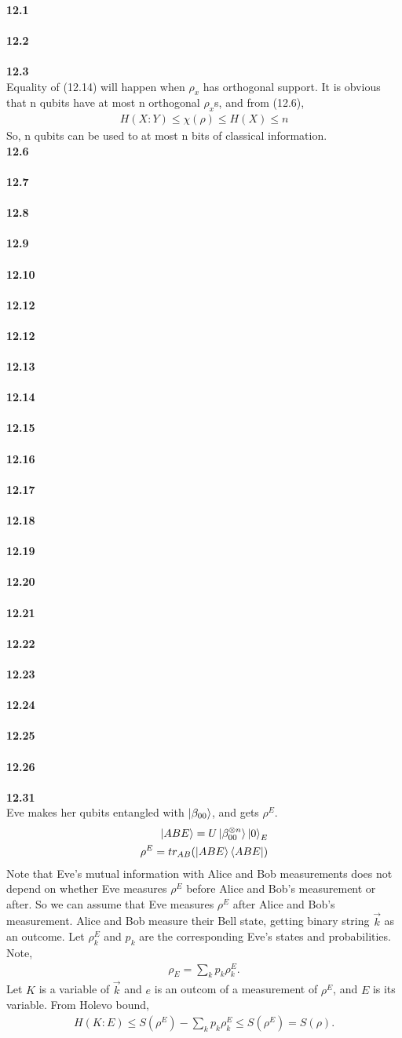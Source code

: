 \documentclass[12pt]{book}
\newcommand{\Textbf}[1]{\hspace{3mm}\\ \textbf{#1}\\}
\begin{document}
\Textbf{12.1}
\Textbf{12.2}
\Textbf{12.3}
Equality of (12.14) will happen when $\rho_x$ has orthogonal support. It is obvious that n qubits have at most n orthogonal $\rho_x$s, and from (12.6), 
\begin{align}
H(X:Y) \le \chi(\rho) \le H(X) \le n
\end{align}
So, n qubits can be used to at most n bits of classical information.
\Textbf{12.6}
\Textbf{12.7}

\Textbf{12.8}
\Textbf{12.9}
\Textbf{12.10}
\Textbf{12.12}
\Textbf{12.12}
\Textbf{12.13}
\Textbf{12.14}
\Textbf{12.15}
\Textbf{12.16}
\Textbf{12.17}
\Textbf{12.18}
\Textbf{12.19}
\Textbf{12.20}
\Textbf{12.21}
\Textbf{12.22}
\Textbf{12.23}
\Textbf{12.24}
\Textbf{12.25}
\Textbf{12.26}
\Textbf{12.31}
Eve makes her qubits entangled with $\ket{\beta_{00}}$, and gets $\rho^E$.
\begin{align}
\ket{ABE} = U\ket{\beta_{00}^{\otimes n}}\ket{0}_E\\
\rho^E = tr_{AB} (\ket{ABE} \bra{ABE})
\end{align}
Note that Eve's mutual information with Alice and Bob measurements does not depend on whether Eve measures $\rho^E$ before Alice and Bob's measurement or after.
So we can assume that Eve measures $\rho^E$ after Alice and Bob's measurement.
Alice and Bob measure their Bell state, getting binary string $\vec{k}$ as an outcome.
Let $\rho^E_k$ and $p_k$ are the corresponding Eve's states and probabilities.
Note,
\begin{align}
\rho_E = \sum_k p_k \rho^E_k.
\end{align}
Let $K$ is a variable of $\vec{k}$ and $e$ is an outcom of a measurement of $\rho^E$, and $E$ is its variable.  From Holevo bound, 
\begin{align}
H(K:E) \le S(\rho^E) - \sum_k p_k \rho^E_k \le S(\rho^E) = S(\rho).
\end{align}
\end{document}

